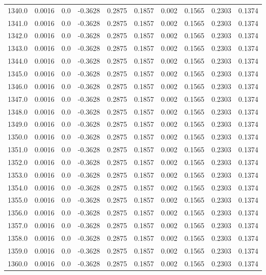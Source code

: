 \begin{longtable}{lrrrrrrrrr}
1340.0 & 0.0016 & 0.0 & -0.3628 & 0.2875 & 0.1857 & 0.002 & 0.1565 & 0.2303 & 0.1374 \\
1341.0 & 0.0016 & 0.0 & -0.3628 & 0.2875 & 0.1857 & 0.002 & 0.1565 & 0.2303 & 0.1374 \\
1342.0 & 0.0016 & 0.0 & -0.3628 & 0.2875 & 0.1857 & 0.002 & 0.1565 & 0.2303 & 0.1374 \\
1343.0 & 0.0016 & 0.0 & -0.3628 & 0.2875 & 0.1857 & 0.002 & 0.1565 & 0.2303 & 0.1374 \\
1344.0 & 0.0016 & 0.0 & -0.3628 & 0.2875 & 0.1857 & 0.002 & 0.1565 & 0.2303 & 0.1374 \\
1345.0 & 0.0016 & 0.0 & -0.3628 & 0.2875 & 0.1857 & 0.002 & 0.1565 & 0.2303 & 0.1374 \\
1346.0 & 0.0016 & 0.0 & -0.3628 & 0.2875 & 0.1857 & 0.002 & 0.1565 & 0.2303 & 0.1374 \\
1347.0 & 0.0016 & 0.0 & -0.3628 & 0.2875 & 0.1857 & 0.002 & 0.1565 & 0.2303 & 0.1374 \\
1348.0 & 0.0016 & 0.0 & -0.3628 & 0.2875 & 0.1857 & 0.002 & 0.1565 & 0.2303 & 0.1374 \\
1349.0 & 0.0016 & 0.0 & -0.3628 & 0.2875 & 0.1857 & 0.002 & 0.1565 & 0.2303 & 0.1374 \\
1350.0 & 0.0016 & 0.0 & -0.3628 & 0.2875 & 0.1857 & 0.002 & 0.1565 & 0.2303 & 0.1374 \\
1351.0 & 0.0016 & 0.0 & -0.3628 & 0.2875 & 0.1857 & 0.002 & 0.1565 & 0.2303 & 0.1374 \\
1352.0 & 0.0016 & 0.0 & -0.3628 & 0.2875 & 0.1857 & 0.002 & 0.1565 & 0.2303 & 0.1374 \\
1353.0 & 0.0016 & 0.0 & -0.3628 & 0.2875 & 0.1857 & 0.002 & 0.1565 & 0.2303 & 0.1374 \\
1354.0 & 0.0016 & 0.0 & -0.3628 & 0.2875 & 0.1857 & 0.002 & 0.1565 & 0.2303 & 0.1374 \\
1355.0 & 0.0016 & 0.0 & -0.3628 & 0.2875 & 0.1857 & 0.002 & 0.1565 & 0.2303 & 0.1374 \\
1356.0 & 0.0016 & 0.0 & -0.3628 & 0.2875 & 0.1857 & 0.002 & 0.1565 & 0.2303 & 0.1374 \\
1357.0 & 0.0016 & 0.0 & -0.3628 & 0.2875 & 0.1857 & 0.002 & 0.1565 & 0.2303 & 0.1374 \\
1358.0 & 0.0016 & 0.0 & -0.3628 & 0.2875 & 0.1857 & 0.002 & 0.1565 & 0.2303 & 0.1374 \\
1359.0 & 0.0016 & 0.0 & -0.3628 & 0.2875 & 0.1857 & 0.002 & 0.1565 & 0.2303 & 0.1374 \\
1360.0 & 0.0016 & 0.0 & -0.3628 & 0.2875 & 0.1857 & 0.002 & 0.1565 & 0.2303 & 0.1374 \\

\end{longtable}
